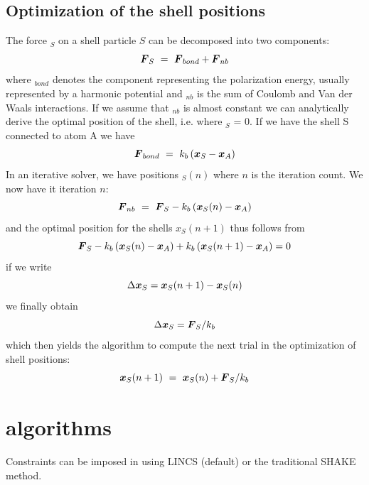 \subsection{Optimization of the shell positions}
The force $_S$ on a shell particle $S$ can be decomposed into two
components:
\begin{equation}
\mbox{\boldmath ${F}$}_S ~=~ \mbox{\boldmath ${F}$}_{bond} + \mbox{\boldmath ${F}$}_{nb}
\end{equation}
where $_{bond}$ denotes the component representing the
polarization energy, usually represented by a harmonic potential and
$_{nb}$ is the sum of Coulomb and Van der Waals interactions. If we
assume that $_{nb}$ is almost constant we can analytically derive the
optimal position of the shell, i.e. where $_S$ = 0. If we have the
shell S connected to atom A we have
\begin{equation}
\mbox{\boldmath ${F}$}_{bond} ~=~ k_b \left( \mbox{\boldmath ${x}$}_S - \mbox{\boldmath ${x}$}_A\right)
\end{equation}
In an iterative solver, we have positions $_S(n)$ where $n$ is
the iteration count. We now have it iteration $n$:
\begin{equation}
\mbox{\boldmath ${F}$}_{nb} ~=~ \mbox{\boldmath ${F}$}_S - k_b \left( \mbox{\boldmath ${x}$}_S(n) - \mbox{\boldmath ${x}$}_A\right)
\end{equation}
and the optimal position for the shells $x_S(n+1)$ thus follows from
\begin{equation}
\mbox{\boldmath ${F}$}_S - k_b \left( \mbox{\boldmath ${x}$}_S(n) - \mbox{\boldmath ${x}$}_A\right) + k_b \left( \mbox{\boldmath ${x}$}_S(n+1) - \mbox{\boldmath ${x}$}_A\right) = 0
\end{equation}
if we write
\begin{equation}
\Delta \mbox{\boldmath ${x}$}_S = \mbox{\boldmath ${x}$}_S(n+1) - \mbox{\boldmath ${x}$}_S(n)
\end{equation}
we finally obtain
\begin{equation}
\Delta \mbox{\boldmath ${x}$}_S = \mbox{\boldmath ${F}$}_S/k_b
\end{equation}
which then yields the algorithm to compute the next trial in the optimization
of shell positions:
\begin{equation}
\mbox{\boldmath ${x}$}_S(n+1) ~=~ \mbox{\boldmath ${x}$}_S(n) + \mbox{\boldmath ${F}$}_S/k_b
\end{equation}


\section{ algorithms}
Constraints can be imposed in {\gromacs} using LINCS (default) or
the traditional SHAKE method.

